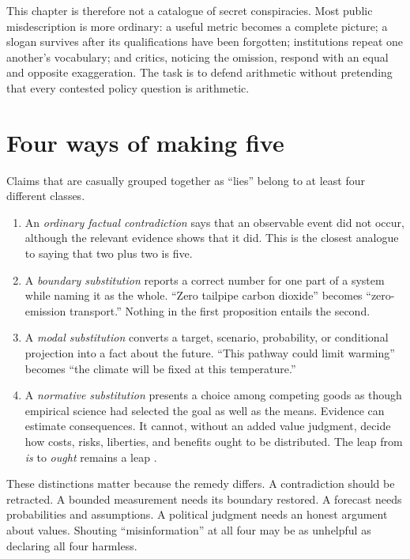 ﻿\documentclass[12pt,a4paper]{book}
\begin{document}
This chapter is therefore not a catalogue of secret conspiracies.  Most public
misdescription is more ordinary: a useful metric becomes a complete picture;
a slogan survives after its qualifications have been forgotten; institutions
repeat one another's vocabulary; and critics, noticing the omission, respond
with an equal and opposite exaggeration.  The task is to defend arithmetic
without pretending that every contested policy question is arithmetic.

\section{Four ways of making five}

Claims that are casually grouped together as ``lies'' belong to at least four
different classes.

\begin{enumerate}
\item An \emph{ordinary factual contradiction} says that an observable event
did not occur, although the relevant evidence shows that it did.  This is the
closest analogue to saying that two plus two is five.

\item A \emph{boundary substitution} reports a correct number for one part of
a system while naming it as the whole.  ``Zero tailpipe carbon dioxide''
becomes ``zero-emission transport.''  Nothing in the first proposition entails
the second.

\item A \emph{modal substitution} converts a target, scenario, probability, or
conditional projection into a fact about the future.  ``This pathway could
limit warming'' becomes ``the climate will be fixed at this temperature.''

\item A \emph{normative substitution} presents a choice among competing goods
as though empirical science had selected the goal as well as the means.
Evidence can estimate consequences.  It cannot, without an added value
judgment, decide how costs, risks, liberties, and benefits ought to be
distributed.  The leap from \emph{is} to \emph{ought} remains a leap
\cite[Book~III, Part~I, sec.~1]{Hume-Treatise}.
\end{enumerate}

These distinctions matter because the remedy differs.  A contradiction should
be retracted.  A bounded measurement needs its boundary restored.  A forecast
needs probabilities and assumptions.  A political judgment needs an honest
argument about values.  Shouting ``misinformation'' at all four may be as
unhelpful as declaring all four harmless.
\end{document}
